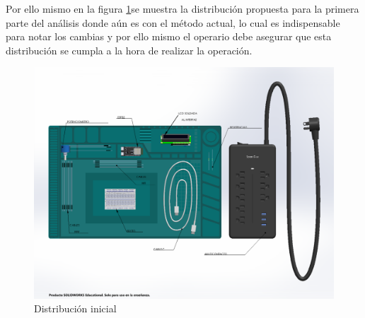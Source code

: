     Por ello mismo en la figura \ref{fig:Distribucion inicial}se muestra la distribución propuesta para la primera parte del análisis donde aún es con el método actual, lo cual es indispensable para notar los cambias y por ello mismo el operario debe asegurar que esta distribución se cumpla a la hora de realizar la operación.
        \begin{figure}[H] 
        \centering
        \includegraphics[trim = {1mm 1mm 1mm 1mm},clip,scale=0.3]{22/Img/ensamblaje.pdf}
        \caption{Distribución inicial}
        \label{fig:Distribucion inicial}
    \end{figure}
    
